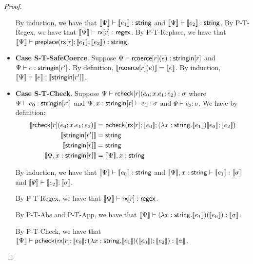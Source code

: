 \documentclass[11pt,leqno]{article}
\theoremstyle{definition}
\newcommand{\rcoerce}[2]{{\sf rcoerce}[#1](#2)}
\newcommand{\rcheck}[4]{ {\sf rcheck}[#1](#2;#3;#4) }
\newcommand{\stringin}[1]{{\sf stringin}[#1]}
\newcommand{\tcheck}[4]{{\sf pcheck}(#1; #2; #3; #4)}
\newcommand{\preplace}[3]{{\sf preplace}(#1;#2;#3)}
\newcommand{\rx}[1]{ {\sf rx}[#1] }
\newcommand{\str}{{\sf string}}
\newcommand{\regex}{{\sf regex}}
\newcommand{\sctx}{\Psi} %
\newcommand{\trden}[1]{\llbracket #1 \rrbracket} %
\begin{document}
\begin{proof}
\begin{itemize}[label=$ $,itemsep=1ex]
By induction, we have that $\trden{\sctx} \vdash \trden{e_1} : \str$ and $\trden{\sctx} \vdash \trden{e_2} : \str$. By P-T-Regex, we have that $\trden{\sctx} \vdash \rx{r} : \regex$. By P-T-Replace, we have that $\trden{\sctx} \vdash \preplace{\rx{r}}{\trden{e_1}}{\trden{e_2}} : \str$.

\item \textbf{Case S-T-SafeCoerce}.
Suppose $\sctx \vdash \rcoerce{r}{e} : \stringin{r}$ and $\sctx \vdash e : \stringin{r'}$. By definition, $\trden{ \rcoerce{r}{e} } = \trden{e}$.
By induction, $\trden{\sctx} \vdash \trden{e} : \trden{\stringin{r'}}$.

\item \textbf{Case S-T-Check}.
Suppose $\sctx \vdash \rcheck{r}{e_0}{x.e_1}{e_2} : \sigma$ where
$\sctx \vdash e_0 : \stringin{r'}$ and 
$\sctx, x : \stringin{r} \vdash e_1 : \sigma$ and
$\sctx \vdash e_2 : \sigma$. We have by definition:
\begin{align*}
\trden{\rcheck{r}{e_0}{x.e_1}{e_2}} &= \tcheck{\rx{r}}{\trden{e_0}}{(\lambda x : \str.\trden{e_1}) \trden{e_0}}{\trden{e_2}}\\
\trden{\stringin{r'}} &= \str\\
\trden{\stringin{r}} &= \str\\
\trden{\sctx, x : \stringin{r}} &= \trden{\sctx}, x : \str
\end{align*}

By induction, we have that $\trden{\sctx} \vdash \trden{e_0} : \str$ and $\trden{\sctx}, x : \str \vdash \trden{e_1} : \trden{\sigma}$ and $\trden{\sctx} \vdash \trden{e_2} : \trden{\sigma}$.

By P-T-Regex, we have that $\trden{\sctx} \vdash \rx{r} : \regex$.

By P-T-Abs and P-T-App, we have that $\trden{\sctx} \vdash (\lambda x : \str.\trden{e_1})(\trden{e_0}) : \trden{\sigma}$.

By P-T-Check, we have that $\trden{\sctx} \vdash \tcheck{\rx{r}}{\trden{e_0}}{(\lambda x : \str.\trden{e_1})(\trden{e_0})}{\trden{e_2}} : \trden{\sigma}$.

\end{itemize}

\end{proof}
\end{document}
